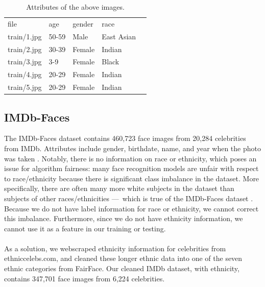 \begin{table}[H]
\centering
\caption{Attributes of the above images.}
\begin{tabular}{lllll}
file & age & gender & race \\
train/1.jpg & 50-59 & Male & East Asian \\
train/2.jpg & 30-39 & Female & Indian\\
train/3.jpg & 3-9 & Female & Black  \\
train/4.jpg & 20-29 & Female & Indian\\
train/5.jpg & 20-29 & Female & Indian        
\end{tabular}
\end{table}

\subsection{IMDb-Faces} \label{imdb_data}
The IMDb-Faces dataset contains 460,723 face images from 20,284 celebrities from IMDb. Attributes include gender, birthdate, name, and year when the photo was taken \cite{Rothe-ICCVW-2015}. Notably, there is no information on race or ethnicity, which poses an issue for algorithm fairness: many face recognition models are unfair with respect to race/ethnicity because there is significant class imbalance in the dataset. More specifically, there are often many more white subjects in the dataset than subjects of other races/ethnicities — which is true of the IMDb-Faces dataset \cite{shepley2019deep}. Because we do not have label information for race or ethnicity, we cannot correct this imbalance. Furthermore, since we do not have ethnicity information, we cannot use it as a feature in our training or testing. 
\\
\\
As a solution, we webscraped ethnicity information for celebrities from ethniccelebs.com, and cleaned these longer ethnic data into one of the seven ethnic categories from FairFace. Our cleaned IMDb dataset, with ethnicity, contains 347,701 face images from 6,224 celebrities.


